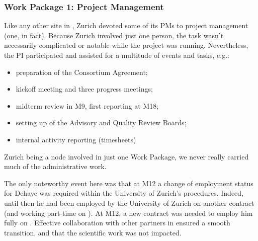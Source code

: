 \subsubsection{Work Package 1: Project Management}

Like any other site in \ODK, Zurich devoted some of its PMs to project management (one, in fact). Because Zurich involved just one person, the task wasn't necessarily complicated or notable while the project was running. Nevertheless, the PI participated and assisted for a multitude of events and tasks, {e.g.}:
\begin{itemize}
\item preparation of the Consortium Agreement;
\item kickoff meeting and three progress meetings;
\item midterm review in M9, first reporting at M18;
\item setting up of the Advisory and Quality Review Boards;
\item internal activity reporting (timesheets)
\end{itemize}

Zurich being a node involved in just one Work Package, we never really carried much of the administrative work. 

The only noteworthy event here was that at M12 a change of employment status for Dehaye was required within the University of Zurich's procedures. Indeed, until then he had been employed by the University of Zurich on another contract (and working part-time on \ODK). At M12, a new contract was needed to employ him fully on \ODK. Effective collaboration with other partners in \ODK ensured a smooth transition, and that the scientific work was not impacted.